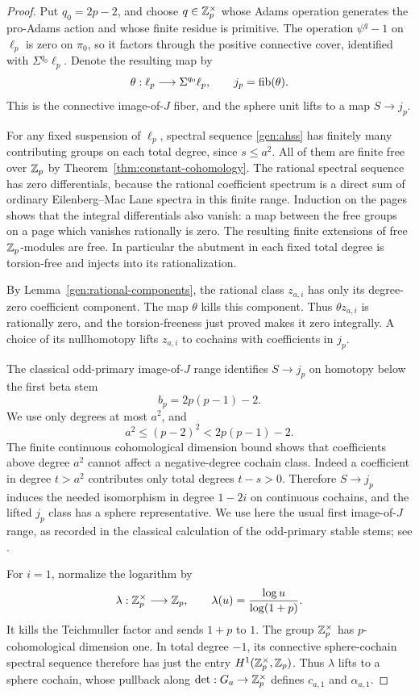 \begin{proof}
Put $q_0=2p-2$, and choose $q\in\mathbb Z_p^\times$ whose Adams operation
generates the pro-Adams action and whose finite residue is primitive.
The operation $\psi^q-1$ on $\ell_p$ is zero on $\pi_0$, so it factors
through the positive connective cover, identified with
$\Sigma^{q_0}\ell_p$.  Denote the resulting map by
\[
 \theta:\ell_p\longrightarrow\Sigma^{q_0}\ell_p,
 \qquad j_p=\operatorname{fib}(\theta).
\]
This is the connective image-of-$J$ fiber, and the sphere unit lifts
to a map $S\longrightarrow j_p$.

For any fixed suspension of $\ell_p$, spectral sequence
\eqref{gen:ahss} has finitely many contributing groups on each total
degree, since $s\leq a^2$.  All of them are finite free over $\mathbb Z_p$ by
Theorem~\ref{thm:constant-cohomology}.  The rational spectral sequence
has zero differentials, because the rational coefficient spectrum is
a direct sum of ordinary Eilenberg--Mac Lane spectra in this finite
range.  Induction on the pages shows that the integral differentials
also vanish: a map between the free groups on a page which vanishes
rationally is zero.  The resulting finite extensions of free
$\mathbb Z_p$-modules are free.  In particular the abutment in each fixed
total degree is torsion-free and injects into its rationalization.

By Lemma~\ref{gen:rational-components}, the rational class $z_{a,i}$
has only its degree-zero coefficient component.  The map $\theta$
kills this component.  Thus $\theta z_{a,i}$ is rationally zero, and
the torsion-freeness just proved makes it zero integrally.  A choice
of its nullhomotopy lifts $z_{a,i}$ to cochains with coefficients in
$j_p$.

The classical odd-primary image-of-$J$ range identifies $S\to j_p$
on homotopy below the first beta stem
\[
 b_p=2p(p-1)-2.
\]
We use only degrees at most $a^2$, and
\begin{equation}\label{gen:beta-range}
 a^2\leq(p-2)^2<2p(p-1)-2.
\end{equation}
The finite continuous cohomological dimension bound shows that
coefficients above degree $a^2$ cannot affect a negative-degree
cochain class.  Indeed a coefficient in degree $t>a^2$ contributes
only total degrees $t-s>0$.  Therefore $S\to j_p$ induces the needed
isomorphism in degree $1-2i$ on continuous cochains, and the lifted
$j_p$ class has a sphere representative.  We use here the usual first
image-of-$J$ range, as recorded in the classical calculation of the
odd-primary stable stems; see
\cite[Theorems~1.1.14 and~1.5.19(a)]{RavenelGreenBook}.

For $i=1$, normalize the logarithm by
\[
 \lambda:\mathbb Z_p^\times\longrightarrow\mathbb Z_p,
 \qquad \lambda(u)=\frac{\log u}{\log(1+p)}.
\]
It kills the Teichmuller factor and sends $1+p$ to $1$.  The group
$\mathbb Z_p^\times$ has $p$-cohomological dimension one.  In total degree
$-1$, its connective sphere-cochain spectral sequence therefore has
just the entry $H^1(\mathbb Z_p^\times,\mathbb Z_p)$.  Thus $\lambda$ lifts to a
sphere cochain, whose pullback along $\det:G_a\to\mathbb Z_p^\times$
defines $c_{a,1}$ and $\alpha_{a,1}$.
\end{proof}

